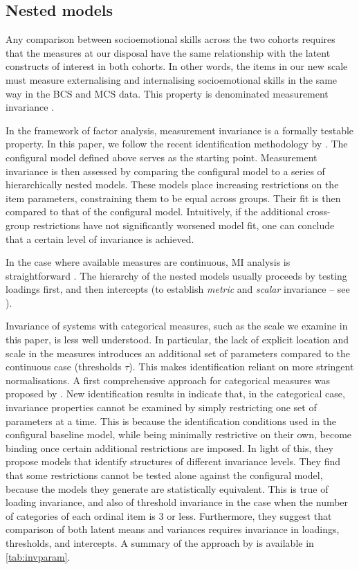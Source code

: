 \subsection{Nested models \label{sec:nested}}

Any comparison between socioemotional skills across the two cohorts requires that the measures at our disposal have the same relationship with the latent constructs of interest in both cohorts. In other words, the items in our new scale must measure externalising and internalising socioemotional skills in the same way in the BCS and MCS data. This property is denominated measurement invariance \citep{Vandenberg2000a,Putnick2016}.

In the framework of factor analysis, measurement invariance is a formally testable property. In this paper, we follow the recent identification methodology by \citet{Wu2016a}. The configural model defined above serves as the starting point. Measurement invariance is then assessed by comparing the configural model to a series of hierarchically nested models. These models place increasing restrictions on the item parameters, constraining them to be equal across groups. Their fit is then compared to that of the configural model. Intuitively, if the additional cross-group restrictions have not significantly worsened model fit, one can conclude that a certain level of invariance is achieved. 

In the case where available measures are continuous, MI analysis is straightforward \citep{vandeSchoot2012}. The hierarchy of the nested models usually proceeds by testing loadings first, and then intercepts (to establish \emph{metric} and \emph{scalar} invariance -- see \citealp{Vandenberg2000a}).

Invariance of systems with categorical measures, such as the scale we examine in this paper, is less well understood. In particular, the lack of explicit location and scale in the measures introduces an additional set of parameters compared to the continuous case (thresholds $\tau$). This makes identification reliant on more stringent normalisations. A first comprehensive approach for categorical measures was proposed by \cite{Millsap2004}. New identification results in \cite{Wu2016a} indicate that, in the categorical case, invariance properties cannot be examined by simply restricting one set of parameters at a time. This is because the identification conditions used in the configural baseline model, while being minimally restrictive on their own, become binding once certain additional restrictions are imposed. In light of this, they propose models that identify structures of different invariance levels. They find that some restrictions cannot be tested alone against the configural model, because the models they generate are statistically equivalent. This is true of loading invariance, and also of threshold invariance in the case when the number of categories of each ordinal item is 3 or less. Furthermore, they suggest that comparison of both latent means and variances requires invariance in loadings, thresholds, and intercepts. A summary of the approach by \cite{Wu2016a} is available in \autoref{tab:invparam}.

